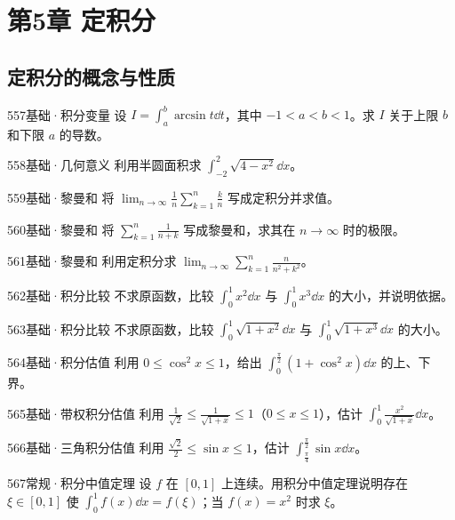 \section{第5章 定积分}
\subsection{定积分的概念与性质}
\begin{exercise}{557}{基础·积分变量}
设 $I=\int_a^b\arcsin t\dd t$，其中 $-1<a<b<1$。求 $I$ 关于上限 $b$ 和下限 $a$ 的导数。
\end{exercise}
\begin{exercise}{558}{基础·几何意义}
利用半圆面积求 $\int_{-2}^2\sqrt{4-x^2}\dd x$。
\end{exercise}
\begin{exercise}{559}{基础·黎曼和}
将 $\lim_{n\to\infty}\frac1n\sum_{k=1}^n\frac{k}{n}$ 写成定积分并求值。
\end{exercise}
\begin{exercise}{560}{基础·黎曼和}
将 $\sum_{k=1}^n\frac1{n+k}$ 写成黎曼和，求其在 $n\to\infty$ 时的极限。
\end{exercise}
\begin{exercise}{561}{基础·黎曼和}
利用定积分求 $\lim_{n\to\infty}\sum_{k=1}^n\frac{n}{n^2+k^2}$。
\end{exercise}
\begin{exercise}{562}{基础·积分比较}
不求原函数，比较 $\int_0^1x^2\dd x$ 与 $\int_0^1x^3\dd x$ 的大小，并说明依据。
\end{exercise}
\begin{exercise}{563}{基础·积分比较}
不求原函数，比较 $\int_0^1\sqrt{1+x^2}\dd x$ 与 $\int_0^1\sqrt{1+x^3}\dd x$ 的大小。
\end{exercise}
\begin{exercise}{564}{基础·积分估值}
利用 $0\le\cos^2x\le1$，给出 $\int_0^{\frac{\pi}{2}}(1+\cos^2x)\dd x$ 的上、下界。
\end{exercise}
\begin{exercise}{565}{基础·带权积分估值}
利用 $\frac{1}{\sqrt2}\le\frac{1}{\sqrt{1+x}}\le1$（$0\le x\le1$），估计 $\int_0^1\frac{x^2}{\sqrt{1+x}}\dd x$。
\end{exercise}
\begin{exercise}{566}{基础·三角积分估值}
利用 $\frac{\sqrt2}{2}\le\sin x\le1$，估计 $\int_{\frac{\pi}{4}}^{\frac{\pi}{2}}\sin x\dd x$。
\end{exercise}
\begin{exercise}{567}{常规·积分中值定理}
设 $f$ 在 $[0,1]$ 上连续。用积分中值定理说明存在 $\xi\in[0,1]$ 使 $\int_0^1f(x)\dd x=f(\xi)$；当 $f(x)=x^2$ 时求 $\xi$。
\end{exercise}
